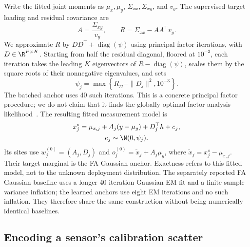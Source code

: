 Write the fitted joint moments as $\mu_x,\mu_y$, $\Sigma_{xx},\Sigma_{xy}$, and $v_y$. The supervised target loading and residual covariance are
\begin{equation}
  A=\frac{\Sigma_{xy}}{v_y},\qquad
  R=\Sigma_{xx}-AA^\top v_y.
  \label{meth:residual-cov}
\end{equation}
We approximate $R$ by $DD^\top+\operatorname{diag}(\psi)$ using principal factor iterations, with $D\in\R^{P\times K}$. Starting from half the residual diagonal, floored at $10^{-3}$, each iteration takes the leading $K$ eigenvectors of $R-\operatorname{diag}(\psi)$, scales them by the square roots of their nonnegative eigenvalues, and sets
\begin{equation}
  \psi_j=\max\!\left\{R_{jj}-\|D_j\|^2,10^{-3}\right\}.
  \label{meth:uniqueness}
\end{equation}
The batched anchor uses 40 such iterations. This is a concrete principal factor procedure; we do not claim that it finds the globally optimal factor analysis likelihood~\citep{rubin1982em,tipping1999ppca}. The resulting fitted measurement model is
\begin{equation}
  \begin{gathered}
  x^{s}_j=\mu_{x,j}+A_j(y-\mu_y)+D_j^\top h+e_j,\\
  e_j\sim\N(0,\psi_j).
  \end{gathered}
  \label{meth:anchor-model}
\end{equation}
Its sites use $w_j^{(0)}=(A_j,D_j)$ and $o_j^{(0)}=\widetilde x_j+A_j\mu_y$, where $\widetilde x_j=x^{s}_j-\mu_{x,j}$. Their target marginal is the FA Gaussian anchor. Exactness refers to this fitted model, not to the unknown deployment distribution. The separately reported FA Gaussian baseline uses a longer 40 iteration Gaussian EM fit and a finite sample variance inflation; the learned anchors use eight EM iterations and no such inflation. They therefore share the same construction without being numerically identical baselines.

\subsection{Encoding a sensor's calibration scatter}

